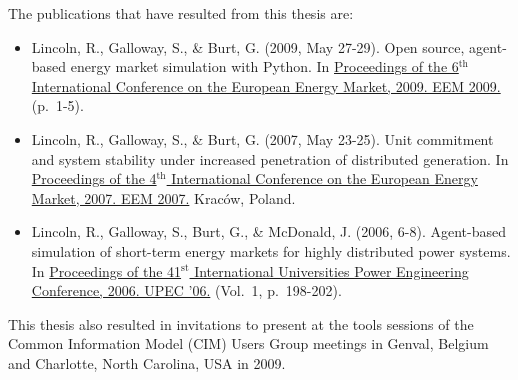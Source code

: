 The publications that have resulted from this thesis are:
\begin{itemize}
\item Lincoln, R., Galloway, S., \& Burt, G. (2009, May 27-29). Open source,
agent-based energy market simulation with Python. In \ul{Proceedings of
the 6$^{\textrm{th}}$ International Conference on the European Energy Market,
2009. EEM 2009.} (p.~1-5).

\item Lincoln, R., Galloway, S., \& Burt, G. (2007, May 23-25). Unit
commitment and system stability under increased penetration of distributed
generation. In \ul{Proceedings of the 4$^{\textrm{th}}$ International Conference
on the European Energy Market, 2007. EEM 2007.} Krac\'ow, Poland.

\item Lincoln, R., Galloway, S., Burt, G., \& McDonald, J. (2006, 6-8).
Agent-based simulation of short-term energy markets for highly distributed
power systems. In \ul{Proceedings of the 41$^{\textrm{st}}$ International
Universities Power Engineering Conference, 2006. UPEC '06.} (Vol.~1,
p.~198-202).
\end{itemize}
This thesis also resulted in invitations to present at the tools sessions of the
Common Information Model (CIM) Users Group meetings in Genval, Belgium and
Charlotte, North Carolina, USA in 2009.


